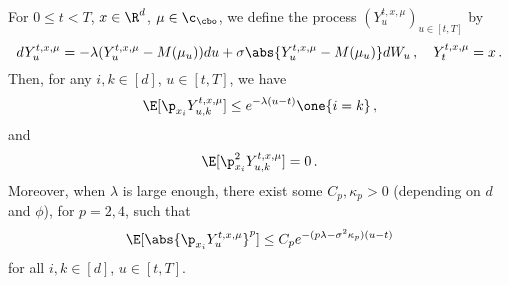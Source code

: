 \documentclass{amsart}
\begin{document}
\begin{lemma}
	\label{lm:prop-y}
	For $0 \le t < T$, $x \in \R^d$, $\mu \in \c_\cbo$, we define the process $(Y^{t,x,\mu}_u)_{u \in [t,T]}$ by 
	\begin{equation*}
		dY^{t,x,\mu}_u = -\lambda (Y^{t,x,\mu}_u - M(\mu_u)) du + \sigma \abs{Y^{t,x,\mu}_u - M(\mu_u)} dW_u \,, \quad Y^{t,x,\mu}_t = x \,.
	\end{equation*}
	Then, for any $i,k \in [d]$, $u \in [t,T]$, we have 
	\begin{equation*}
		\E [\p_{x_i} Y^{t,x,\mu}_{u,k}] \le e^{-\lambda (u-t)} \one{i=k} \,,
	\end{equation*}
	and 
	\begin{equation*}
		\E [\p_{x_i}^2 Y^{t,x,\mu}_{u,k}] = 0 \,.
	\end{equation*}
	Moreover, when $\lambda$ is large enough, there exist some $C_p, \kappa_p > 0$ (depending on $d$ and $\phi$), for $p=2,4$, such that
	\begin{equation*}
		\E [\abs{\p_{x_i} Y^{t,x,\mu}_{u}}^p] \le C_p e^{-(p\lambda - \sigma^2 \kappa_p)(u-t)} 
	\end{equation*}
	for all $i,k \in [d]$, $u \in [t,T]$.
\end{lemma}
\end{document}

